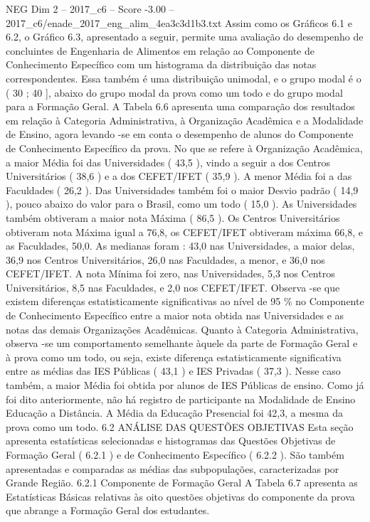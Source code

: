 \begin{textsample}{NEG Dim 2 – 2017\_c6 – Score -3.00 – 2017\_c6/enade\_2017\_eng\_alim\_4ea3c3d1b3.txt}
Assim como os Gráficos 6.1 e 6.2, o Gráfico 6.3, apresentado a seguir, permite uma avaliação do desempenho de concluintes de Engenharia de Alimentos em relação ao Componente de Conhecimento Específico com um histograma da distribuição das notas correspondentes.
Essa também é uma distribuição unimodal, e o grupo modal é o ( 30 ; 40 ], abaixo do grupo modal da prova como um todo e do grupo modal para a Formação Geral.
A Tabela 6.6 apresenta uma comparação dos resultados em relação à Categoria Administrativa, à Organização Acadêmica e a Modalidade de Ensino, agora levando -se em conta o desempenho de alunos do Componente de Conhecimento Específico da prova.
No que se refere à Organização Acadêmica, a maior Média foi das Universidades ( 43,5 ), vindo a seguir a dos Centros Universitários ( 38,6 ) e a dos CEFET/IFET ( 35,9 ).
A menor Média foi a das Faculdades ( 26,2 ).
Das Universidades também foi o maior Desvio padrão ( 14,9 ), pouco abaixo do valor para o Brasil, como um todo ( 15,0 ).
As Universidades também obtiveram a maior nota Máxima ( 86,5 ).
Os Centros Universitários obtiveram nota Máxima igual a 76,8, os CEFET/IFET obtiveram máxima 66,8, e as Faculdades, 50,0.
As medianas foram : 43,0 nas Universidades, a maior delas, 36,9 nos Centros Universitários, 26,0 nas Faculdades, a menor, e 36,0 nos CEFET/IFET.
A nota Mínima foi zero, nas Universidades, 5,3 nos Centros Universitários, 8,5 nas Faculdades, e 2,0 nos CEFET/IFET.
Observa -se que existem diferenças estatisticamente significativas ao nível de 95 \% no Componente de Conhecimento Específico entre a maior nota obtida nas Universidades e as notas das demais Organizações Acadêmicas.
Quanto à Categoria Administrativa, observa -se um comportamento semelhante àquele da parte de Formação Geral e à prova como um todo, ou seja, existe diferença estatisticamente significativa entre as médias das IES Públicas ( 43,1 ) e IES Privadas ( 37,3 ).
Nesse caso também, a maior Média foi obtida por alunos de IES Públicas de ensino.
Como já foi dito anteriormente, não há registro de participante na Modalidade de Ensino Educação a Distância.
A Média da Educação Presencial foi 42,3, a mesma da prova como um todo. 6.2 ANÁLISE DAS QUESTÕES OBJETIVAS Esta seção apresenta estatísticas selecionadas e histogramas das Questões Objetivas de Formação Geral ( 6.2.1 ) e de Conhecimento Específico ( 6.2.2 ).
São também apresentadas e comparadas as médias das subpopulações, caracterizadas por Grande Região. 6.2.1 Componente de Formação Geral A Tabela 6.7 apresenta as Estatísticas Básicas relativas às oito questões objetivas do componente da prova que abrange a Formação Geral dos estudantes.

\end{textsample}
